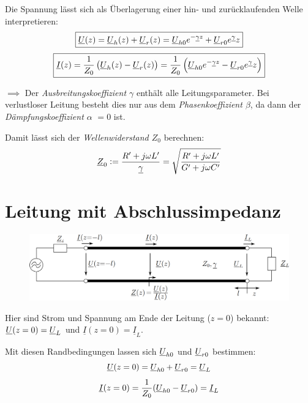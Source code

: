 Die Spannung lässt sich als Überlagerung einer hin- und zurücklaufenden Welle interpretieren:
\begin{equation}
    \boxed{ \underline{U}(z)=\underline{U}_h(z)+\underline{U}_r(z) = \underline{U}_{h0} e^{-\underline{\gamma} z}+\underline{U}_{r0} e^{\underline{\gamma}}z }
\label{eqn:u-uberlagerung}
\end{equation}
\begin{equation}
    \boxed{ \underline{I}(z)=\frac{1}{Z_0} \left( \underline{U}_h(z)-\underline{U}_r(z)\right) = \frac{1}{Z_0} \left( \underline{U}_{h0} e^{-\underline{\gamma} z}-\underline{U}_{r0} e^{\underline{\gamma}}z \right) }
\label{eqn:i-uberlagerung}
\end{equation}

$\implies$ Der \emph{Ausbreitungskoeffizient $\gamma$} enthält alle Leitungsparameter.
Bei verlustloser Leitung besteht dies nur aus dem \emph{Phasenkoeffizient $\beta$}, da dann der \emph{Dämpfungskoeffizient $\alpha$} $= 0$ ist.

Damit lässt sich der \emph{Wellenwiderstand $Z_0$} berechnen:
\begin{equation}
    \underline{Z}_0 := \frac{R'+j\omega L'}{\underline{\gamma}} = \sqrt{\frac{R'+j\omega L'}{G'+j\omega C'}}
\end{equation}



\section{Leitung mit Abschlussimpedanz}
\begin{figure}[H]
    \centering
    \includegraphics[width=\textwidth]{images/leitung_abschlussimpedanz.png}
\end{figure}
Hier sind Strom und Spannung am Ende der Leitung ($z=0$) bekannt: $\underline{U}(z=0)=\underline{U}_L$ und $\underline{I}(z=0)=\underline{I}_L$.

Mit diesen Randbedingungen lassen sich $\underline{U}_{h0}$ und $\underline{U}_{r0}$ bestimmen:
\begin{equation*}
    \underline{U}(z=0) = \underline{U}_{h0} + \underline{U}_{r0} = \underline{U}_L
\end{equation*}
\begin{equation*}
    \underline{I}(z=0) = \frac{1}{Z_0} (\underline{U}_{h0} - \underline{U}_{r0}) = \underline{I}_L
\end{equation*}

